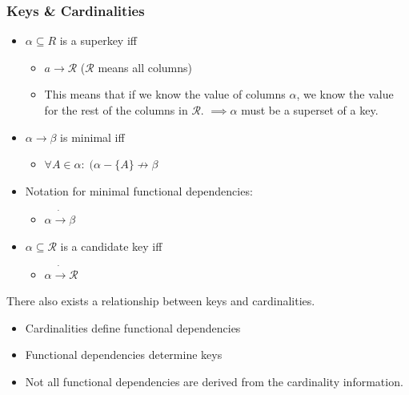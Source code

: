 \subsubsection{Keys \& Cardinalities}
\begin{itemize}
\item $\alpha \subseteq R$ is a superkey iff
\begin{itemize}
\item $a \to \mathcal{R}$ ($\mathcal{R}$ means all columns)
\item This means that if we know the value of columns $\alpha$, we know the value for the rest of the columns in $\mathcal{R}$. $\implies \alpha$ must be a superset of a key.
\end{itemize}
\item $\alpha \to \beta$ is minimal iff
\begin{itemize}
\item $\forall A \in \alpha:\; (\alpha - \{A\} \not\to \beta$
\end{itemize}
\item Notation for minimal functional dependencies:
\begin{itemize}
\item $\alpha \dot{\to} \beta$
\end{itemize}
\item $\alpha \subseteq \mathcal{R}$ is a candidate key iff
\begin{itemize}
\item $\alpha \dot{\to} \mathcal{R}$
\end{itemize}
\end{itemize}
There also exists a relationship between keys and cardinalities.
\begin{itemize}
\item Cardinalities define functional dependencies
\item Functional dependencies determine keys
\item Not all functional dependencies are derived from the cardinality information.
\end{itemize}

